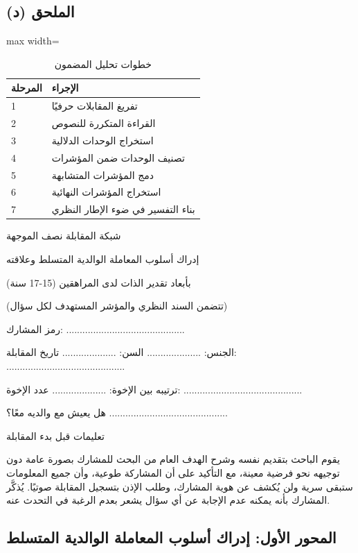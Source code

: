 \documentclass[12pt,oneside]{report}
\begin{document}
\subsection*{الملحق (د)}
\begin{table}[H]
\centering
\caption{خطوات تحليل المضمون}
\small
\renewcommand{\arraystretch}{1.3}
\setlength{\tabcolsep}{4pt}
\begin{adjustbox}{max width=\textwidth}
\begin{tabular}{p{3.8cm} p{9.6cm}}
\toprule
\textbf{المرحلة} & \textbf{الإجراء} \\
\midrule
1 & تفريغ المقابلات حرفيًا \\
2 & القراءة المتكررة للنصوص \\
3 & استخراج الوحدات الدلالية \\
4 & تصنيف الوحدات ضمن المؤشرات \\
5 & دمج المؤشرات المتشابهة \\
6 & استخراج المؤشرات النهائية \\
7 & بناء التفسير في ضوء الإطار النظري \\
\bottomrule
\end{tabular}
\end{adjustbox}
\end{table}
شبكة المقابلة نصف الموجهة

إدراك أسلوب المعاملة الوالدية المتسلط وعلاقته

بأبعاد تقدير الذات لدى المراهقين (15-17 سنة)

(تتضمن السند النظري والمؤشر المستهدف لكل سؤال)

رمز المشارك: ............................................

الجنس: ....................       السن:  ....................      تاريخ المقابلة: ............................................

ترتيبه بين الإخوة: ....................       عدد الإخوة: ............................................

هل يعيش مع والديه معًا؟ ............................................

تعليمات قبل بدء المقابلة

يقوم الباحث بتقديم نفسه وشرح الهدف العام من البحث للمشارك بصورة عامة دون توجيهه نحو فرضية معينة، مع التأكيد على أن المشاركة طوعية، وأن جميع المعلومات ستبقى سرية ولن يُكشف عن هوية المشارك، وطلب الإذن بتسجيل المقابلة صوتيًا. يُذكَّر المشارك بأنه يمكنه عدم الإجابة عن أي سؤال يشعر بعدم الرغبة في التحدث عنه.

\subsection*{المحور الأول: إدراك أسلوب المعاملة الوالدية المتسلط}
\end{document}
